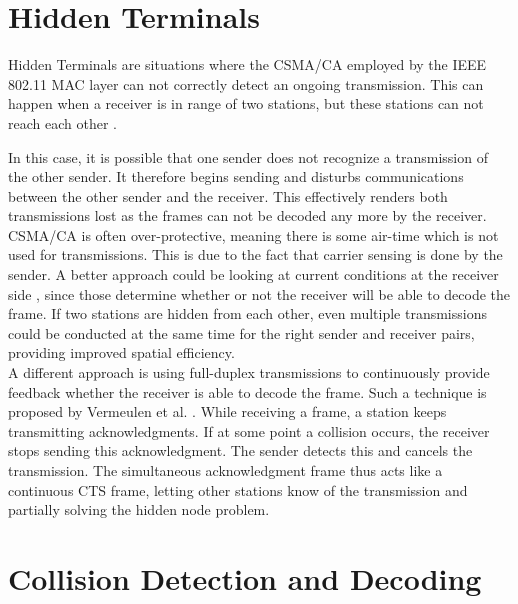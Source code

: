 
\section{Hidden Terminals}

Hidden Terminals are situations where the \gls{CSMA/CA} employed by the IEEE 802.11 MAC layer can not correctly detect an ongoing transmission. This can happen when a receiver is in range of two stations, but these stations can not reach each other \cite{perahia2013}.

In this case, it is possible that one sender does not recognize a transmission of the other sender. It therefore begins sending and disturbs communications between the other sender and the receiver. This effectively renders both transmissions lost as the frames can not be decoded any more by the receiver.\\

\gls{CSMA/CA} is often over-protective, meaning there is some air-time which is not used for transmissions. This is due to the fact that carrier sensing is done by the sender. A better approach could be looking at current conditions at the receiver side \cite{halperin2007}, since those determine whether or not the receiver will be able to decode the frame. If two stations are hidden from each other, even multiple transmissions could be conducted at the same time for the right sender and receiver pairs, providing improved spatial efficiency.\\

A different approach is using full-duplex transmissions to continuously provide feedback whether the receiver is able to decode the frame. Such a technique is proposed by Vermeulen et al. \cite{vermeulen2016}. While receiving a frame, a station keeps transmitting acknowledgments. If at some point a collision occurs, the receiver stops sending this acknowledgment. The sender detects this and cancels the transmission. The simultaneous acknowledgment frame thus acts like a continuous CTS frame, letting other stations know of the transmission and partially solving the hidden node problem.



\section{Collision Detection and Decoding}

